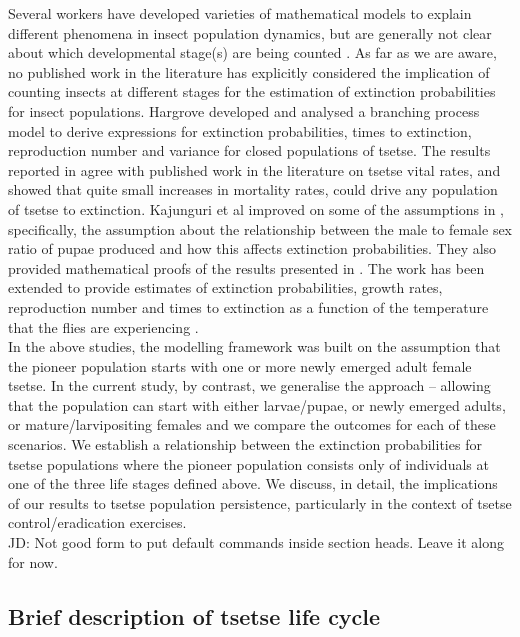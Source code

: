Several workers have developed varieties of mathematical models to explain different phenomena in insect population dynamics, but are generally not clear about which developmental stage(s) are being counted \cite{Ylioja1999,Artzrouni2003,Hargrove2005a,Adams2005,Barclay2011d,Peck2012a,Lin2015,Kajunguri2019}.  As far as we are aware, no published work in the literature has explicitly considered the implication of counting insects at different stages for the estimation of extinction probabilities for insect populations. Hargrove \cite{Hargrove2005a} developed and analysed a branching process model to derive expressions for extinction probabilities, times to extinction, reproduction number and variance for closed populations of tsetse. The results reported in \cite{Hargrove2005a} agree with published work in the literature on tsetse vital rates, and showed that quite small increases in mortality rates,  could drive any population of tsetse to extinction. Kajunguri et al \cite{Kajunguri2019} improved on some of the assumptions in \cite{Hargrove2005a}, specifically, the assumption about the relationship between the male to female sex ratio of pupae produced and how this affects extinction probabilities. They also provided mathematical proofs of the results presented in \cite{Hargrove2005a}. The work has been extended to provide estimates of extinction probabilities, growth rates, reproduction number and times to extinction as a function of the temperature that the flies are experiencing \cite{Are2019}. \\



In the above studies, the modelling framework was built on the assumption that the pioneer population starts with one or more newly emerged adult female tsetse. In the current study, by contrast, we  generalise the approach – allowing that the population can start with either larvae/pupae, or newly emerged adults, or mature/larvipositing females and we compare the outcomes for each of these scenarios. We establish a relationship between the extinction probabilities for tsetse populations where the pioneer population consists only of individuals at one of the three life stages defined above. We discuss, in detail, the implications of our results to tsetse population persistence, particularly in the context of tsetse control/eradication exercises. \\


JD: Not good form to put default commands inside section heads. Leave it along for now.
\subsection{\bf Brief description of tsetse life cycle}

